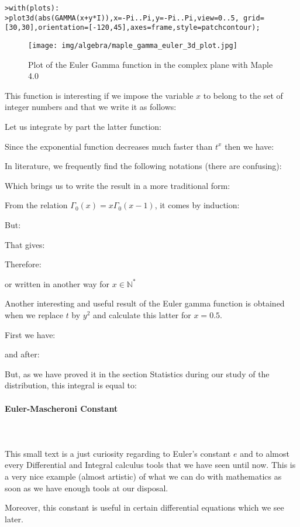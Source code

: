 	\texttt{>with(plots):\\}
	\texttt{>plot3d(abs(GAMMA(x+y*I)),x=-Pi..Pi,y=-Pi..Pi,view=0..5, grid=[30,30],orientation=[-120,45],axes=frame,style=patchcontour);}
	
	\begin{figure}[H]
		\centering
		\texttt{[image: img/algebra/maple\_gamma\_euler\_3d\_plot.jpg]}
		\caption{Plot of the Euler Gamma function in the complex plane with Maple 4.0}
	\end{figure}
	This function is interesting if we impose the variable $x$ to belong to the set of integer numbers and that we write it as follows:
	
	Let us integrate by part the latter function:
	
	Since the exponential function decreases much faster than $t^x$ then we have:
	
	In literature, we frequently find the following notations (there are confusing):
	
	Which brings us to write the result in a more traditional form:
	
	From the relation $\Gamma_{0}(x)=x\Gamma_{0}(x-1)$, it comes by induction:
	
	But:
	
	That gives:
	
	Therefore:
	
	or written in another way for $x\in \mathbb{N}^*$
	
	Another interesting and useful result of the Euler gamma function is obtained when we replace $t$ by $y^2$ and calculate this latter for $x=0.5$.
	
	First we have:
	
	and after:
	
	But, as we have proved it in the section Statistics during our study of  the distribution, this integral is equal to:
	
	
	\pagebreak
	\paragraph{Euler-Mascheroni Constant}\mbox{}\\\\
	This small text is a just curiosity regarding to Euler's constant $e$ and to almost every Differential and Integral calculus tools that we have seen until now. This is a very nice example (almost artistic) of what we can do with mathematics as soon as we have enough tools at our disposal.
	
	Moreover, this constant is useful in certain differential equations which we see later.
	
